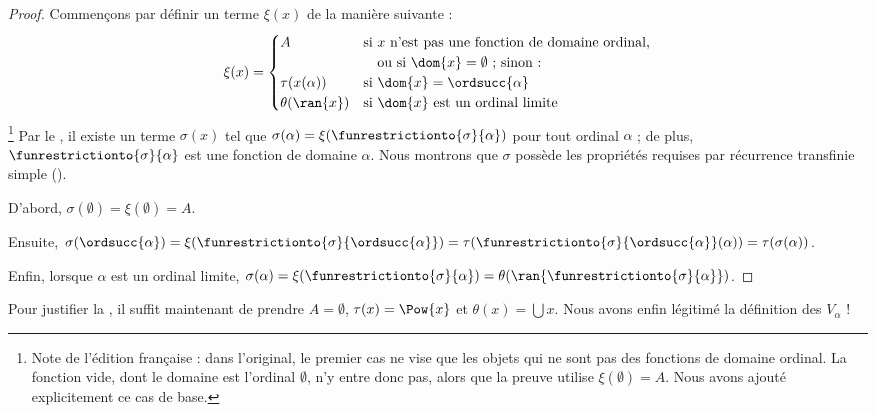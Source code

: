 \documentclass[../../../include/open-logic-section]{subfiles}
\begin{document}
\begin{proof}
Commençons par définir un terme $\xi(x)$ de la manière suivante :
\[
	\xi(x) =
	\begin{cases}
			A &\text{si $x$ n'est pas une fonction de domaine ordinal,}\\
			&\hspace{1em}\text{ou si $\dom{x}=\emptyset$ ; sinon :}\\
			\tau(x(\alpha)) & \text{si $\dom{x} = \ordsucc{\alpha}$}\\
			\theta(\ran{x}) & \text{si $\dom{x}$ est un ordinal limite}
	\end{cases}
\]
\footnote{Note de l'édition française : dans l'original, le premier
cas ne vise que les objets qui ne sont pas des fonctions de domaine
ordinal. La fonction vide, dont le domaine est l'ordinal
$\emptyset$, n'y entre donc pas, alors que la preuve utilise
$\xi(\emptyset)=A$. Nous avons ajouté explicitement ce cas de base.}
Par le , il existe un terme $\sigma(x)$ tel
que $\sigma(\alpha) =
\xi(\funrestrictionto{\sigma}{\alpha})$ pour tout ordinal
$\alpha$ ; de plus, $\funrestrictionto{\sigma}{\alpha}$ est une
fonction de domaine $\alpha$. Nous montrons que $\sigma$ possède les
propriétés requises par récurrence transfinie simple
().

D'abord, $\sigma(\emptyset) = \xi(\emptyset) = A$.

Ensuite, $\sigma(\ordsucc{\alpha}) =
\xi(\funrestrictionto{\sigma}{\ordsucc{\alpha}}) =
\tau(\funrestrictionto{\sigma}{\ordsucc{\alpha}}(\alpha)) =
\tau(\sigma(\alpha))$.

Enfin, lorsque $\alpha$ est un ordinal limite,
$\sigma(\alpha) = \xi(\funrestrictionto{\sigma}{\alpha}) =
\theta(\ran{\funrestrictionto{\sigma}{\alpha}})$.
\end{proof}
\noindent
Pour justifier la , il suffit maintenant de
prendre $A = \emptyset$, $\tau(x) = \Pow{x}$ et
$\theta(x) = \bigcup x$. Nous avons enfin légitimé la définition des
$V_\alpha$ !{}
\end{document}
